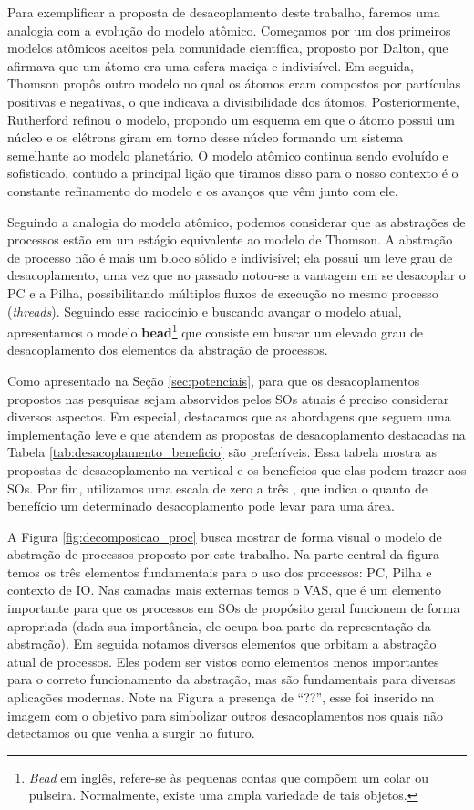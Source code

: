 Para exemplificar a proposta de desacoplamento deste trabalho, faremos uma
analogia com a evolução do modelo atômico. Começamos por um dos primeiros
modelos atômicos aceitos pela comunidade científica, proposto por Dalton, que
afirmava que um átomo era uma esfera maciça e indivisível. Em seguida, Thomson
propôs outro modelo no qual os átomos eram compostos por partículas positivas e
negativas, o que indicava a divisibilidade dos átomos. Posteriormente, Rutherford
refinou o modelo, propondo um esquema em que o átomo possui um núcleo e os
elétrons giram em torno desse núcleo formando um sistema semelhante ao modelo
planetário. O modelo atômico continua sendo evoluído e sofisticado, contudo a principal lição que tiramos disso para o nosso contexto é o
constante refinamento do modelo e os avanços que vêm junto com ele.

Seguindo a analogia do modelo atômico, podemos considerar que as abstrações de
processos estão em um estágio equivalente ao modelo de Thomson. A abstração de
processo não é mais um bloco sólido e indivisível; ela possui um leve grau de
desacoplamento, uma vez que no passado notou-se a vantagem em se desacoplar o PC
e a Pilha, possibilitando múltiplos fluxos de execução no mesmo processo
(\emph{threads}). Seguindo esse raciocínio e buscando avançar o modelo atual,
apresentamos o modelo \textbf{bead}\footnote{\emph{Bead} em inglês,
refere-se às pequenas contas que compõem um colar ou pulseira. Normalmente,
existe uma ampla variedade de tais objetos.} que consiste em buscar um elevado
grau de desacoplamento dos elementos da abstração de processos.

Como apresentado na Seção \ref{sec:potenciais}, para que os desacoplamentos
propostos nas pesquisas sejam absorvidos pelos SOs atuais é preciso considerar
diversos aspectos. Em especial, destacamos que as abordagens que seguem uma
implementação leve e que atendem as propostas de desacoplamento destacadas na
Tabela \ref{tab:desacoplamento_beneficio} são preferíveis. Essa tabela mostra as
propostas de desacoplamento na vertical e os benefícios que elas podem trazer
aos SOs. Por fim, utilizamos uma escala de zero a três , que indica o
quanto de benefício um determinado desacoplamento pode levar para uma área.



A Figura \ref{fig:decomposicao_proc} busca mostrar de forma visual o modelo de
abstração de processos proposto por este trabalho. Na parte central da figura
temos os três elementos fundamentais para o uso dos processos: PC, Pilha e
contexto de IO. Nas camadas mais externas temos o VAS, que é um elemento
importante para que os processos em SOs de propósito geral funcionem de forma
apropriada (dada sua importância, ele ocupa boa parte da representação da
abstração).  Em seguida notamos diversos elementos que orbitam a abstração
atual de processos. Eles podem ser vistos como elementos menos importantes para
o correto funcionamento da abstração, mas são fundamentais para diversas
aplicações modernas. Note na Figura a presença de ``??'', esse foi inserido na
imagem com o objetivo para simbolizar outros desacoplamentos nos quais não
detectamos ou que venha a surgir no futuro.

